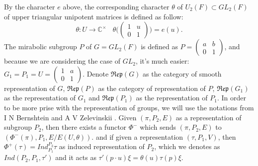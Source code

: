 \documentclass[12pt,a4paper,english]{article}
\theoremstyle{plain}
\theoremstyle{definition}
\begin{document}
By the character $e$ above, the corresponding character $\theta$ of $U_{2}(F)\subset GL_{2}(F)$ of upper triangular
unipotent matrices is defined as follow:
\begin{equation*}
    \theta: U\rightarrow \mathbb{C}^{\times}\ \ \ \ \theta\bigg(\begin{pmatrix}
    1 & u\\
    0 & 1
    \end{pmatrix}\bigg)=e(u).
\end{equation*}
The mirabolic subgroup $P$ of $G=GL_{2}(F)$ is defined as $P=\begin{pmatrix}
a&b\\
0&1
\end{pmatrix}$, and because we are considering the case of $GL_{2}$, it's much easier: $G_{1}=P_{1}=U=\begin{pmatrix}
1 & a\\
0& 1
\end{pmatrix}.$ Denote $\mathfrak{Rep}(G)$ as the category of smooth representation of $G$, $\mathfrak{Rep}(P)$ as the category of representation of $P$, $\mathfrak{Rep}(G_{1})$ as the representation of $G_{1}$ and $\mathfrak{Rep}(P_{1})$ as the representation of $P_{1}$. In order to be more prise with the representation of groups, we will use the notations from  I N Bernshtein and A V Zelevinskii \cite{bernstein1976representations}. Given $(\pi, P_{2}, E)$ as a representation of subgroup $P_{2}$, then there exists a functor $\Phi^{-}$ which sends $(\pi,P_{2},E)$ to $(\Phi^{-}(\pi),P_{1}, E/E(U,\theta))$. and if given a representation $(\tau, P_{1}, V)$, then $\Phi^{+}(\tau)=Ind^{P_{2}}_{P_{1}}\tau$ as induced representation of $P_{2}$, which we denotes as $Ind(P_{2}, P_{1}, \tau')$ and it acts as $\tau'(p\cdot u)\xi=\theta(u)\tau(p)\xi$.
\end{document}
